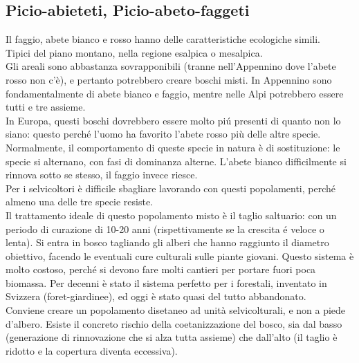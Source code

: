 \subsection{Picio-abieteti, Picio-abeto-faggeti}
Il faggio, abete bianco e rosso hanno delle caratteristiche ecologiche simili.\\
Tipici del piano montano, nella regione esalpica o mesalpica.\\
Gli areali sono abbastanza sovrapponibili (tranne nell'Appennino dove l'abete rosso non c'è), e pertanto potrebbero creare boschi misti. In Appennino sono fondamentalmente di abete bianco e faggio, mentre nelle Alpi potrebbero essere tutti e tre assieme.\\
In Europa, questi boschi dovrebbero essere molto piú presenti di quanto non lo siano: questo perché l'uomo ha favorito l'abete rosso più delle altre specie.\\
Normalmente, il comportamento di queste specie in natura è di sostituzione: le specie si alternano, con fasi di dominanza alterne. L'abete bianco difficilmente si rinnova sotto se stesso, il faggio invece riesce.\\
Per i selvicoltori è difficile sbagliare lavorando con questi popolamenti, perché almeno una delle tre specie resiste.\\
Il trattamento ideale di questo popolamento misto è il taglio saltuario: con un periodo di curazione di 10-20 anni (rispettivamente se la crescita é veloce o lenta). Si entra in bosco tagliando gli alberi che hanno raggiunto il diametro obiettivo, facendo le eventuali cure culturali sulle piante giovani. Questo sistema è molto costoso, perché si devono fare molti cantieri per portare fuori poca biomassa. Per decenni è stato il sistema perfetto per i forestali, inventato in Svizzera (foret-giardinee), ed oggi è stato quasi del tutto abbandonato.\\
Conviene creare un popolamento disetaneo ad unità selvicolturali, e non a piede d'albero. Esiste il concreto rischio della coetanizzazione del bosco, sia dal basso (generazione di rinnovazione che si alza tutta assieme) che dall'alto (il taglio è ridotto e la copertura diventa eccessiva). 
